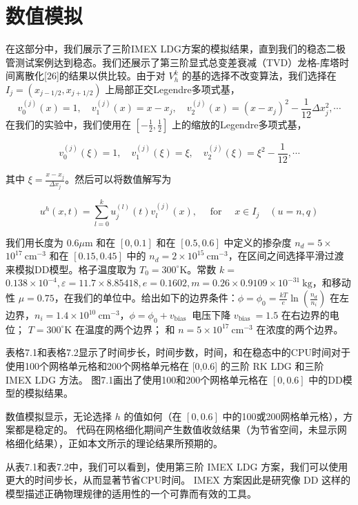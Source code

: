 \section{数值模拟}
在这部分中，我们展示了三阶IMEX LDG方案的模拟结果，直到我们的稳态二极管测试案例达到稳态。我们还展示了第三阶显式总变差衰减（TVD）龙格-库塔时间离散化[26]的结果以供比较。由于对 $V_{h}^{k}$ 的基的选择不改变算法，我们选择在 $I_{j}=\left(x_{j-1 / 2}, x_{j+1 / 2}\right)$ 上局部正交Legendre多项式基，
$$
    v_{0}^{(j)}(x)=1, \quad v_{1}^{(j)}(x)=x-x_{j}, \quad v_{2}^{(j)}(x)=\left(x-x_{j}\right)^{2}-\frac{1}{12} \Delta x_{j}^{2}, \cdots
$$
在我们的实验中，我们使用在 $\left[-\frac{1}{2}, \frac{1}{2}\right]$ 上的缩放的Legendre多项式基，

$$
    v_{0}^{(j)}(\xi)=1, \quad v_{1}^{(j)}(\xi)=\xi, \quad v_{2}^{(j)}(\xi)=\xi^{2}-\frac{1}{12}, \cdots
$$

其中 $\xi=\frac{x-x_{j}}{\Delta x_{j}}$。然后可以将数值解写为

$$
    u^{h}(x, t)=\sum_{l=0}^{k} u_{j}^{(l)}(t) v_{l}^{(j)}(x), \quad \text { for } \quad x \in I_{j} \quad(u=n, q)
$$

我们用长度为 $0.6 \mu \mathrm{m}$ 和在 $[0,0.1]$ 和在 $[0.5,0.6]$ 中定义的掺杂度 $n_{d}=5 \times$ $10^{17} \mathrm{~cm}^{-3}$ 和在 $[0.15,0.45]$ 中的 $n_{d}=2 \times 10^{15} \mathrm{~cm}^{-3}$，在区间之间选择平滑过渡来模拟DD模型。格子温度取为 $T_{0}=300^{\circ} \mathrm{K}$。常数 $k=$ $0.138 \times 10^{-4}, \varepsilon=11.7 \times 8.85418, e=0.1602, m=0.26 \times 0.9109 \times 10^{-31} \mathrm{~kg}$，和移动性 $\mu=0.75$，在我们的单位中。给出如下的边界条件：$\phi=\phi_{0}=\frac{k T}{e} \ln \left(\frac{n_{d}}{n_{i}}\right)$ 在左边界，$n_{i}=1.4 \times 10^{10} \mathrm{~cm}^{-3}$，$\phi=\phi_{0}+v_{\text {bias }}$ 电压下降 $v_{\text {bias }}=1.5$ 在右边界的电位； $T=300^{\circ} \mathrm{K}$ 在温度的两个边界； 和 $n=5 \times 10^{17} \mathrm{~cm}^{-3}$ 在浓度的两个边界。

表格7.1和表格7.2显示了时间步长，时间步数，时间，和在稳态中的CPU时间对于使用100个网格单元格和200个网格单元格在 [0,0.6] 的三阶 RK LDG 和三阶 IMEX LDG 方法。 图7.1画出了使用100和200个网格单元格在 $[0,0.6]$ 中的DD模型的模拟结果。

数值模拟显示，无论选择 $h$ 的值如何（在 $[0,0.6]$ 中的100或200网格单元格），方案都是稳定的。 代码在网格细化期间产生数值收敛结果（为节省空间，未显示网格细化结果），正如本文所示的理论结果所预期的。

从表7.1和表7.2中，我们可以看到，使用第三阶 IMEX LDG 方案，我们可以使用更大的时间步长，从而显著节省CPU时间。 IMEX 方案因此是研究像 DD 这样的模型描述正确物理规律的适用性的一个可靠而有效的工具。

